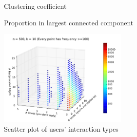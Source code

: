 \documentclass[conference]{IEEEtran}
\begin{document}
\begin{figure}[!t]
\centering
{}                
\caption{Clustering coefficient}
\label{fig_rur_cc}
\end{figure}

\begin{figure}[!t]
\centering
{}                
\caption{Proportion in largest connected component}
\label{fig_rur_lcc}
\end{figure}

\begin{figure}[!t]
\centering
\includegraphics[width=2.5in]{scatter3}
\caption{Scatter plot of users' interaction types}
\label{fig_rur_sca2}
\end{figure}
\end{document}
